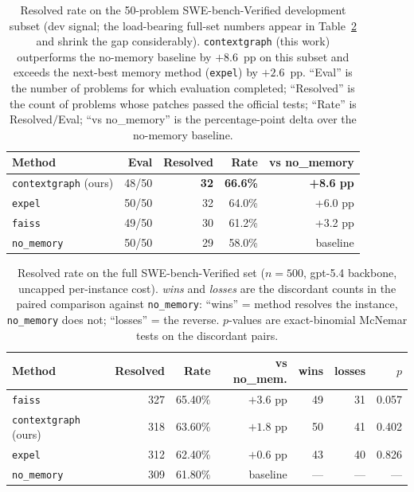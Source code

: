 \begin{table}[t]
\centering
\caption{Resolved rate on the 50-problem SWE-bench-Verified development subset (dev signal; the load-bearing full-set numbers appear in Table~\ref{tab:verified500} and shrink the gap considerably). \texttt{contextgraph} (this work) outperforms the no-memory baseline by $+8.6$~pp on this subset and exceeds the next-best memory method (\texttt{expel}) by $+2.6$~pp. ``Eval'' is the number of problems for which evaluation completed; ``Resolved'' is the count of problems whose patches passed the official tests; ``Rate'' is Resolved$/$Eval; ``vs no\_memory'' is the percentage-point delta over the no-memory baseline.}
\label{tab:dev50}
\small
\begin{tabular}{lrrrr}
\toprule
\textbf{Method} & \textbf{Eval} & \textbf{Resolved} & \textbf{Rate} & \textbf{vs no\_memory} \\
\midrule
\texttt{contextgraph} (ours) & 48/50 & \textbf{32} & \textbf{66.6\%} & \textbf{+8.6 pp} \\
\texttt{expel}~\cite{zhao2024expel} & 50/50 & 32 & 64.0\% & +6.0 pp \\
\texttt{faiss} & 49/50 & 30 & 61.2\% & +3.2 pp \\
\texttt{no\_memory} & 50/50 & 29 & 58.0\% & baseline \\
\bottomrule
\end{tabular}
\end{table}

\begin{table}[t]
\centering
\caption{Resolved rate on the full SWE-bench-Verified set ($n{=}500$, gpt-5.4 backbone, uncapped per-instance cost). \emph{wins} and \emph{losses} are the discordant counts in the paired comparison against \texttt{no\_memory}: ``wins'' = method resolves the instance, \texttt{no\_memory} does not; ``losses'' = the reverse. $p$-values are exact-binomial McNemar tests on the discordant pairs.}
\label{tab:verified500}
\small
\begin{tabular}{lrrrrrr}
\toprule
\textbf{Method} & \textbf{Resolved} & \textbf{Rate} & \textbf{vs no\_mem.} & \textbf{wins} & \textbf{losses} & \textbf{$p$} \\
\midrule
\texttt{faiss} & 327 & 65.40\% & $+3.6$ pp & 49 & 31 & 0.057 \\
\texttt{contextgraph} (ours) & 318 & 63.60\% & $+1.8$ pp & 50 & 41 & 0.402 \\
\texttt{expel}~\cite{zhao2024expel} & 312 & 62.40\% & $+0.6$ pp & 43 & 40 & 0.826 \\
\texttt{no\_memory} & 309 & 61.80\% & baseline & --- & --- & --- \\
\bottomrule
\end{tabular}
\end{table}

